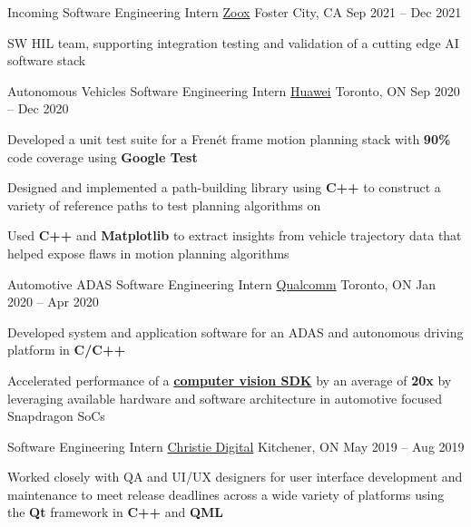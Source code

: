 \documentclass[]{awesome-cv}
\begin{document}
\vspace{-7mm}
\begin{cventries}
	\cventry
	{Incoming Software Engineering Intern}
	{\href{https://zoox.com/}{Zoox}}
	{Foster City, CA}
	{Sep 2021 – Dec 2021}
	{\begin{cvitems}
	    \item SW HIL team, supporting integration testing and validation of a cutting edge AI software stack 
	\end{cvitems}}
	\cventry
	{Autonomous Vehicles Software Engineering Intern}
	{\href{https://www.huawei.com/ca/}{Huawei}}
	{Toronto, ON}
	{Sep 2020 – Dec 2020}
	{\begin{cvitems}
		\item {Developed a unit test suite for a Frenét frame motion planning stack with \textbf{90\%} code coverage using \textbf{Google Test}}
		\item {Designed and implemented a path-building library using \textbf{C++} to construct a variety of reference paths to test planning algorithms on}
		\item {Used \textbf{C++} and \textbf{Matplotlib} to extract insights from vehicle trajectory data that helped expose flaws in motion planning algorithms}
	\end{cvitems}}
	\cventry
	{Automotive ADAS Software Engineering Intern}
	{\href{https://www.qualcomm.com/}{Qualcomm}}
	{Toronto, ON}
	{Jan 2020 – Apr 2020}
	{\begin{cvitems}
		\item {Developed system and application software for an ADAS and autonomous driving platform in \textbf{C/C++}}
		\item {Accelerated performance of a \href{https://developer.qualcomm.com/software/fastcv-sdk}{\textbf{computer vision SDK}} by an average of \textbf{20x} by leveraging available hardware and software architecture in automotive focused Snapdragon SoCs}
		\end{cvitems}}
	\cventry
	{Software Engineering Intern}
	{\href{https://www.christiedigital.com/}{Christie Digital}}
	{Kitchener, ON}
	{May 2019 – Aug 2019}
	{\begin{cvitems}
		\item {Worked closely with QA and UI/UX designers for user interface development and maintenance to meet release deadlines across a wide variety of platforms using the \textbf{Qt} framework in \textbf{C++} and \textbf{QML}}

\end{cvitems}}
\end{cventries}
\end{document}
